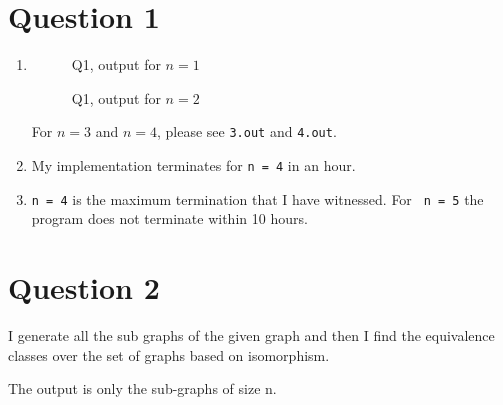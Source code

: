 \documentclass{article}
\begin{document}
\section*{Question 1}

\begin{enumerate}[label=\alph*), start=2]
\item
\begin{figure}[hp]
  
  \caption{Q1, output for $n = 1$ }
\end{figure}

\begin{figure}[hp]
  
  \caption{Q1, output for $n = 2$ }
\end{figure}

For $n =3$ and $n= 4$, please see \texttt{3.out} and \texttt{4.out}.
\item  My implementation terminates for \texttt{n = 4} in an hour.
\item \texttt{n = 4} is the maximum termination that I have
  witnessed. For \texttt{ n = 5} the program does not terminate within
  10 hours. 
\end{enumerate}

\section*{Question 2}
I generate all the sub graphs of the given graph and then I find the
equivalence classes over the set of graphs based on isomorphism.

The output is only the sub-graphs of size n. 
\end{document}
